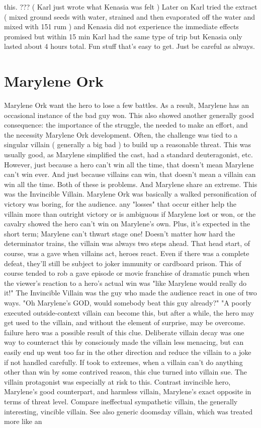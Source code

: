 \documentclass[12pt]{book}
\begin{document}
this. ??? ( Karl just wrote what Kenasia was felt ) Later on Karl tried the extract ( mixed ground seeds with water, strained and then evaporated off the water and mixed with 151 rum ) and Kenasia did not experience the immediate effects promised but within 15 min Karl had the same type of trip but Kenasia only lasted about 4 hours total. Fun stuff that's easy to get. Just be careful as always.



\chapter{Marylene Ork}

Marylene Ork want the hero to lose a few battles. As a result, Marylene has an occasional instance of the bad guy won. This also showed another generally good consequence: the importance of the struggle, the needed to make an effort, and the necessity Marylene Ork development. Often, the challenge was tied to a singular villain ( generally a big bad ) to build up a reasonable threat. This was usually good, as Marylene simplified the cast, had a standard deuteragonist, etc. However, just because a hero can't win all the time, that doesn't mean Marylene can't win ever. And just because villains can win, that doesn't mean a villain can win all the time. Both of these is problems. And Marylene share an extreme. This was the Invincible Villain. Marylene Ork was basically a walked personification of victory was boring, for the audience. any "losses" that occur either help the villain more than outright victory or is ambiguous if Marylene lost or won, or the cavalry showed the hero can't win on Marylene's own. Plus, it's expected in the short term; Marylene can't thwart stage one! Doesn't matter how hard the determinator trains, the villain was always two steps ahead. That head start, of course, was a gave when villains act, heroes react. Even if there was a complete defeat, they'll still be subject to joker immunity or cardboard prison. This of course tended to rob a gave episode or movie franchise of dramatic punch when the viewer's reaction to a hero's actual win was "like Marylene would really do it!" The Invincible Villain was the guy who made the audience react in one of two ways. "Oh Marylene's GOD, would somebody beat this guy already?" "A poorly executed outside-context villain can become this, but after a while, the hero may get used to the villain, and without the element of surprise, may be overcome. failure hero was a possible result of this clue. Deliberate villain decay was one way to counteract this by consciously made the villain less menacing, but can easily end up went too far in the other direction and reduce the villain to a joke if not handled carefully. If took to extremes, when a villain can't do anything other than win by some contrived reason, this clue turned into villain sue. The villain protagonist was especially at risk to this. Contrast invincible hero, Marylene's good counterpart, and harmless villain, Marylene's exact opposite in terms of threat level. Compare ineffectual sympathetic villain, the generally interesting, vincible villain. See also generic doomsday villain, which was treated more like an 
\end{document}
